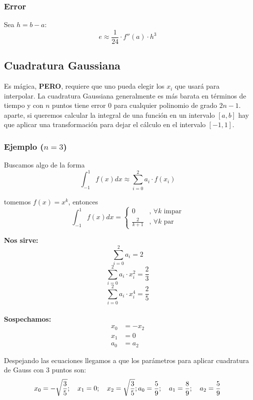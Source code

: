 \documentclass[spanish, fleqn]{article}
\begin{document}
\subsubsection*{Error}
Sea $h = b-a$:
\[e \approx \frac{1}{24} \cdot f''(a) \cdot h^3 \]

\subsection{Cuadratura Gaussiana}
Es mágica, \textbf{PERO}, requiere que uno pueda elegir los $x_i$ que usará para interpolar. La cuadratura Gaussiana generalmente es más barata en términos de tiempo y con $n$ puntos tiene error $0$ para cualquier polinomio de grado $2n-1$.\\

aparte, si queremos calcular la integral de una función en un intervalo $[a, b]$ hay que aplicar una transformación para dejar el cálculo en el intervalo $[-1, 1]$.

\subsubsection*{Ejemplo ($n = 3$)}

Buscamos algo de la forma
\[ \int_{-1}^1 f(x) dx \approx \sum_{i=0}^2 a_i\cdot f(x_i) \]

tomemos $f(x)=x^k$, entonces
\[ \int_{-1}^1 f(x) dx =
\begin{cases}
0 & \text{, } \forall k \text{ impar}\\
\frac{2}{k+1} & \text{, } \forall k \text{ par}
\end{cases}
\]

\textbf{Nos sirve:}
\[ \sum_{i=0}^2 a_i = 2 \]
\[ \sum_{i=0}^2 a_i\cdot x_i^2 = \frac{2}{3} \]
\[ \sum_{i=0}^2 a_i\cdot x_i^4 = \frac{2}{5} \]\\

\textbf{Sospechamos:}
\begin{align*}
        x_0 &= -x_2\\
    x_1 &= 0\\
    a_0 &= a_2
\end{align*}

Despejando las ecuaciones llegamos a que los parámetros para aplicar cuadratura de Gauss con 3 puntos son:
\begin{equation*}
x_0 = -\sqrt{\frac{3}{5}}; \quad x_1 = 0; \quad x_2 = \sqrt{\frac{3}{5}};\\
a_0 = \frac{5}{9}; \quad a_1 = \frac{8}{9}; \quad a_2 = \frac{5}{9}
\end{equation*}
\end{document}
